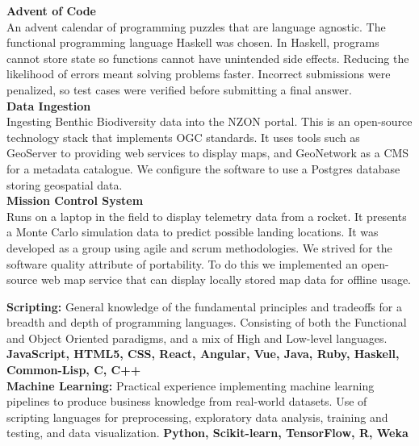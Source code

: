 \documentclass[9pt]{developercv}
\begin{document}

\textbf{Advent of Code} \\
An advent calendar of programming puzzles that are language agnostic. The functional programming language Haskell was chosen. In Haskell, programs cannot store state so functions cannot have unintended side effects. Reducing the likelihood of errors meant solving problems faster. Incorrect submissions were penalized, so test cases were verified before submitting a final answer. \\

\textbf{Data Ingestion} \\
Ingesting Benthic Biodiversity data into the NZON portal. This is an open-source technology stack that implements OGC standards. It uses tools such as GeoServer to providing web services to display maps, and GeoNetwork as a CMS for a metadata catalogue. We configure the software to use a Postgres database storing geospatial data. \\

\textbf{Mission Control System} \\
Runs on a laptop in the field to display telemetry data from a rocket. It presents a Monte Carlo simulation data to predict possible landing locations. It was developed as a group using agile and scrum methodologies. We strived for the software quality attribute of portability. To do this we implemented an open-source web map service that can display locally stored map data for offline usage.



\textbf{Scripting:} General knowledge of the fundamental principles and tradeoffs for a breadth and depth of programming languages. Consisting of both the Functional and Object Oriented paradigms, and a mix of High and Low-level languages. \textbf{JavaScript, HTML5, CSS, React, Angular, Vue, Java, Ruby, Haskell, Common-Lisp, C, C++} \\

\textbf{Machine Learning:} Practical experience implementing machine learning pipelines to produce business knowledge from real-world datasets. Use of scripting languages for preprocessing, exploratory data analysis, training and testing, and data visualization. \textbf{Python, Scikit-learn, TensorFlow, R, Weka} \\
\end{document}

